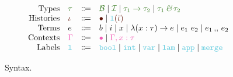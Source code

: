 \documentclass[a4paper,landscape]{article}
\newcommand{\boldcdot}{\bullet}
\newcommand{\bool}{\mathcal{B}}
\newcommand{\integer}{\mathcal{I}}
\newcommand{\intersectionop}{\, \textit{\&} \,}
\newcommand{\lam}[2]{\lambda ({#1}) \to {#2}}
\newcommand{\app}[2]{{#1} ~ {#2}}
\newcommand{\mergeop}{\, ,\!, \,}
\newcommand{\typecolor}[1]{\textcolor{OliveGreen}{#1}}
\newcommand{\contextcolor}[1]{\textcolor{CarnationPink}{#1}}
\newcommand{\derivcolor}[1]{\textcolor{Sepia}{#1}}
\newcommand{\blackmid}{\textcolor{black}{\; \mid \;}}
\newcommand{\labelcolor}[1]{\textcolor{SkyBlue}{\mathtt{#1}}}
\begin{document}
\begin{figure}
    \[
        \begin{array}{rlrl}
            \textrm{Types}     & \typecolor{\tau}      & \Coloneqq & \typecolor{\bool \blackmid \integer \blackmid \tau_1 \to \tau_2 \blackmid \tau_1 \intersectionop \tau_2} \\
            \textrm{Histories} & \derivcolor{\iota}    & \Coloneqq & \derivcolor{\boldcdot \blackmid \labelcolor{l} (\bar{\iota})} \\
            \textrm{Terms}     & e                     & \Coloneqq & b \blackmid i \blackmid x \blackmid \lam {x : \tau} {e} \blackmid \app {e_1} {e_2} \blackmid e_1 \mergeop e_2 \\
            \textrm{Contexts}  & \contextcolor{\Gamma} & \Coloneqq & \contextcolor{\boldcdot \blackmid \Gamma, x : \tau} \\
            \textrm{Labels}    & \labelcolor{l}        & \Coloneqq & \labelcolor{bool} \blackmid \labelcolor{int} \blackmid \labelcolor{var} \blackmid \labelcolor{lam} \blackmid \labelcolor{app} \blackmid \labelcolor{merge}
        \end{array}
    \]
    \caption{Syntax.}
\end{figure}
\end{document}
